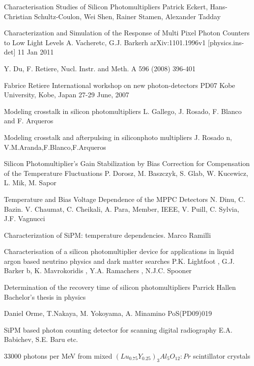 \begin{thebibliography}{99}


Characterisation Studies of Silicon Photomultipliers
Patrick Eckert, Hans-Christian Schultz-Coulon, Wei Shen, Rainer Stamen, Alexander Tadday

Characterization and Simulation of the Response of Multi Pixel Photon Counters to Low
Light Levels
A. Vacheretc, G.J. Barkerh
arXiv:1101.1996v1 [physics.ins-det] 11 Jan 2011

Y. Du, F. Retiere, Nucl. Instr. and Meth. A 596 (2008) 396-401

Fabrice Retiere
International workshop on new photon-detectors PD07
Kobe University, Kobe, Japan
27-29 June, 2007

Modeling crosstalk in silicon photomultipliers
L. Gallego, J. Rosado, F. Blanco and F. Arqueros

Modeling crosstalk and afterpulsing in siliconphoto multipliers
J. Rosado n, V.M.Aranda,F.Blanco,F.Arqueros

Silicon Photomultiplier's Gain Stabilization by Bias Correction for Compensation of the Temperature Fluctuations
P. Dorosz, M. Baszczyk, S. Glab, W. Kucewicz, L. Mik, M. Sapor

Temperature and Bias Voltage Dependence of the MPPC Detectors
N. Dinu, C. Bazin. V. Chaumat, C. Cheikali, A. Para, Member, IEEE, V. Puill, C. Sylvia, J.F. Vagnucci

Characterization of SiPM: temperature dependencies.
Marco Ramilli

Characterisation of a silicon photomultiplier device for applications in liquid argon based neutrino physics and dark matter searches
P.K. Lightfoot , G.J. Barker b, K. Mavrokoridis , Y.A. Ramachers , N.J.C. Spooner

Determination of the recovery time of silicon photomultipliers
Parrick Hallen
Bachelor's thesis in physics

Daniel Orme, T.Nakaya, M. Yokoyama, A. Minamino
PoS(PD09)019

SiPM based photon counting detector for scanning digital radiography
E.A. Babichev, S.E. Baru etc.

33000 photons per MeV from mixed $(Lu_{0.75}Y_{0.25})_{3}Al_{5}O_{12}:Pr$ scintillator crystals

\end{thebibliography}

